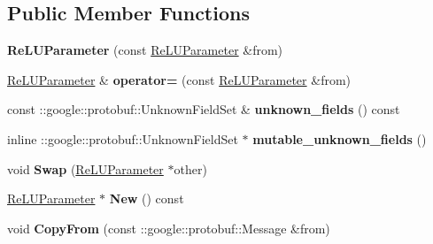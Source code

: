 \subsection*{Public Member Functions}
\begin{DoxyCompactItemize}
\item 
\mbox{\label{classcaffe_1_1_re_l_u_parameter_ae4cd0b5879fa1105272c1dcc80bd22ba}} 
{\bfseries Re\+L\+U\+Parameter} (const \mbox{\hyperlink{classcaffe_1_1_re_l_u_parameter}{Re\+L\+U\+Parameter}} \&from)
\item 
\mbox{\label{classcaffe_1_1_re_l_u_parameter_adc18e3d60acea61907ee3c181c6fc411}} 
\mbox{\hyperlink{classcaffe_1_1_re_l_u_parameter}{Re\+L\+U\+Parameter}} \& {\bfseries operator=} (const \mbox{\hyperlink{classcaffe_1_1_re_l_u_parameter}{Re\+L\+U\+Parameter}} \&from)
\item 
\mbox{\label{classcaffe_1_1_re_l_u_parameter_acefbf338d0a705087f0a5dc3760e6c1d}} 
const \+::google\+::protobuf\+::\+Unknown\+Field\+Set \& {\bfseries unknown\+\_\+fields} () const
\item 
\mbox{\label{classcaffe_1_1_re_l_u_parameter_a526f167173aa6fe3a620d1e3785d5545}} 
inline \+::google\+::protobuf\+::\+Unknown\+Field\+Set $\ast$ {\bfseries mutable\+\_\+unknown\+\_\+fields} ()
\item 
\mbox{\label{classcaffe_1_1_re_l_u_parameter_a082d095781dff614892aed2a0e9e2d29}} 
void {\bfseries Swap} (\mbox{\hyperlink{classcaffe_1_1_re_l_u_parameter}{Re\+L\+U\+Parameter}} $\ast$other)
\item 
\mbox{\label{classcaffe_1_1_re_l_u_parameter_ad44bab272053eaab9c4802981e4c970d}} 
\mbox{\hyperlink{classcaffe_1_1_re_l_u_parameter}{Re\+L\+U\+Parameter}} $\ast$ {\bfseries New} () const
\item 
\mbox{\label{classcaffe_1_1_re_l_u_parameter_aaedc5dfab2e20fe0e8631fd1340c6953}} 
void {\bfseries Copy\+From} (const \+::google\+::protobuf\+::\+Message \&from)
\item 
\mbox{\label{classcaffe_1_1_re_l_u_parameter_a49ebd660d9078b308a4b98eea7e0ec86}} 

\end{DoxyCompactItemize}
